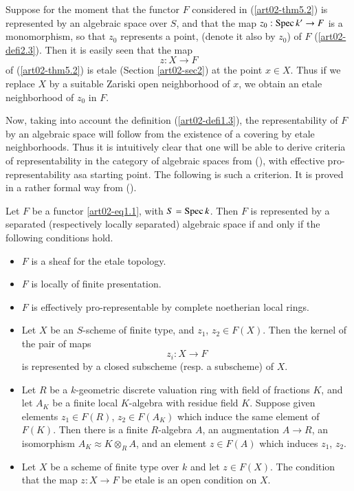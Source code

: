 Suppose for the moment that the functor $F$ considered in (\ref{art02-thm5.2}) is represented by an algebraic space over $S$, and that the map $z_{0}:\operatorname{\mathrm{Spec}} k'\to F$ is a monomorphism, so that $z_{0}$ represents a point, (denote it also by $z_{0}$) of $F$ (\ref{art02-defi2.3}). Then it is easily seen that the map
$$
z:X\to F
$$
of (\ref{art02-thm5.2}) is etale (Section \ref{art02-sec2}) at the point $x\in X$. Thus if we replace $X$ by a suitable Zariski open neighborhood of $x$, we obtain an etale neighborhood of $z_{0}$ in $F$.

Now, taking into account the definition (\ref{art02-defi1.3}), the representability of $F$ by an algebraic space will follow from the existence of a covering by etale neighborhoods. Thus it is intuitively clear that one will be able to derive criteria of representability in the category of algebraic spaces from (\label{art02-thm5.2}), with effective pro-representability as\pageoriginale a starting point. The following is such a criterion. It is proved in a rather formal way from (\label{art02-thm5.2}).

\begin{theorem}\label{art02-thm5.6}
Let $F$ be a functor \eqref{art02-eq1.1}, with $S=\operatorname{\mathrm{Spec}} k$. Then $F$ is represented by a separated (respectively locally separated) algebraic space if and only if the following conditions hold.
\begin{itemize}
\item[{\rm[0]}] $F$ is a sheaf for the etale topology.

\item[{\rm[1]}] $F$ is locally of finite presentation.

\item[{\rm[2]}] $F$ is effectively pro-representable by complete noetherian local rings.

\item[{\rm[3]}] Let $X$ be an $S$-scheme of finite type, and $z_{1}$, $z_{2}\in F(X)$. Then the kernel of the pair of maps
$$
z_{i}:X\to F
$$
is represented by a closed subscheme (resp. a subscheme) of $X$.

\item[{\rm[4]}] Let $R$ be a $k$-geometric discrete valuation ring with field of fractions $K$, and let $A_{K}$ be a finite local $K$-algebra with residue field $K$. Suppose given elements $z_{1}\in F(R)$, $z_{2}\in F(A_{K})$ which induce the same element of $F(K)$. Then there is a finite $R$-algebra $A$, an augmentation $A\to R$, an isomorphism $A_{K}\approx K\otimes_{R}A$, and an element $z\in F(A)$ which induces $z_{1}$, $z_{2}$.

\item[{\rm[5]}] Let $X$ be a scheme of finite type over $k$ and let $z\in F(X)$. The condition that the map $z:X\to F$ be etale is an open condition on $X$.
\end{itemize}
\end{theorem}

